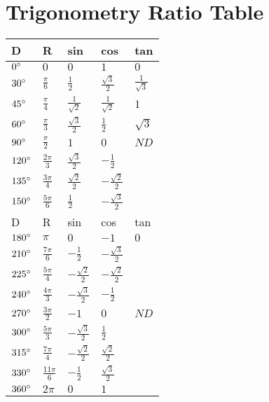 \documentclass{extarticle}
\begin{document}
\section{Trigonometry Ratio Table}
    \begin{tabu}{|X|X|X|X|X|}
    \hline
D				& R					& sin				& cos						& tan						\\ \hline
$0\degree$	& $0$					& $0$				& $1$						& $0$						\\ \hline
$30\degree$	& $\frac{\pi}{6}$	& $\frac{1}{2}$	& $\frac{\sqrt{3}}{2}$	& $\frac{1}{\sqrt{3}}$	\\ \hline
$45\degree$	& $\frac{\pi}{4}$	& $\frac{1}{\sqrt{2}}$	& $\frac{1}{\sqrt{2}}$	& $1$	\\ \hline
$60\degree$	& $\frac{\pi}{3}$	& $\frac{\sqrt{3}}{2}$	& $\frac{1}{2}$	& $\sqrt{3}$	\\ \hline
$90\degree$	& $\frac{\pi}{2}$	& $1$	& $0$	& $ND$	\\ \hline
$120\degree$	& $\frac{2\pi}{3}$	& $\frac{\sqrt{3}}{2}$	& $-\frac{1}{2}$	& $ $	\\ \hline
$135\degree$	& $\frac{3\pi}{4}$	& $\frac{\sqrt{2}}{2}$	& $-\frac{\sqrt{2}}{2}$	& $ $	\\ \hline
$150\degree$	& $\frac{5\pi}{6}$	& $\frac{1}{2}$	& $-\frac{\sqrt{3}}{2}$	& $ $	\\ \hline
D				& R					& sin				& cos						& tan						\\ \hline
$180\degree$	& $\pi$					& $0$				& $-1$						& $0$						\\ \hline
$210\degree$	& $\frac{7\pi}{6}$	& $-\frac{1}{2}$	& $-\frac{\sqrt{3}}{2}$	& $ $	\\ \hline
$225\degree$	& $\frac{5\pi}{4}$	& $-\frac{\sqrt{2}}{2}$	& $-\frac{\sqrt{2}}{2}$	& $ $	\\ \hline
$240\degree$	& $\frac{4\pi}{3}$	& $-\frac{\sqrt{3}}{2}$	& $-\frac{1}{2}$	& $ $	\\ \hline
$270\degree$	& $\frac{3\pi}{2}$	& $-1$	& $0$	& $ND$	\\ \hline
$300\degree$	& $\frac{5\pi}{3}$	& $-\frac{\sqrt{3}}{2}$	& $\frac{1}{2}$	& $ $	\\ \hline
$315\degree$	& $\frac{7\pi}{4}$	& $-\frac{\sqrt{2}}{2}$	& $\frac{\sqrt{2}}{2}$	& $ $	\\ \hline
$330\degree$	& $\frac{11\pi}{6}$	& $-\frac{1}{2}$	& $\frac{\sqrt{3}}{2}$	& $ $	\\ \hline


$360\degree$ & $2\pi$ & $0$ & $1$ & $ $ \\ \hline
    \end{tabu}
\end{document}
